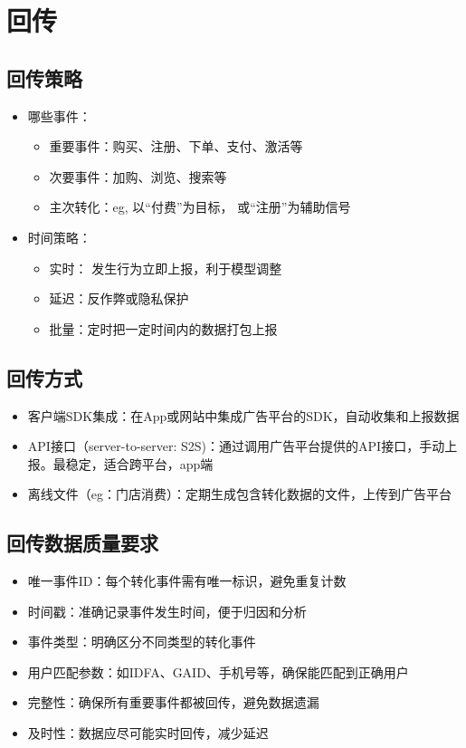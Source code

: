 \documentclass{article}
\begin{document}
\begin{itemize}
\begin{itemize}
\end{itemize}



\section{回传}

\subsection{回传策略}
\begin{itemize}
    \item 哪些事件：
    \begin{itemize}
        \item 重要事件：购买、注册、下单、支付、激活等
        \item 次要事件：加购、浏览、搜索等
        \item 主次转化：eg, 以“付费”为目标， 或“注册”为辅助信号
        \end{itemize}
    \item 时间策略：
    \begin{itemize}
        \item 实时： 发生行为立即上报，利于模型调整
        \item 延迟：反作弊或隐私保护
        \item 批量：定时把一定时间内的数据打包上报
    \end{itemize}
\end{itemize}

\subsection{回传方式}
\begin{itemize}
    \item 客户端SDK集成：在App或网站中集成广告平台的SDK，自动收集和上报数据
    \item API接口（server-to-server: S2S)：通过调用广告平台提供的API接口，手动上报。最稳定，适合跨平台，app端
    \item 离线文件（eg：门店消费）：定期生成包含转化数据的文件，上传到广告平台
\end{itemize}

\subsection{回传数据质量要求}
\begin{itemize}
    \item 唯一事件ID：每个转化事件需有唯一标识，避免重复计数
    \item 时间戳：准确记录事件发生时间，便于归因和分析
    \item 事件类型：明确区分不同类型的转化事件
    \item 用户匹配参数：如IDFA、GAID、手机号等，确保能匹配到正确用户
    \item 完整性：确保所有重要事件都被回传，避免数据遗漏
    \item 及时性：数据应尽可能实时回传，减少延迟
\end{itemize}


\end{itemize}
\end{document}
